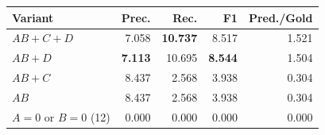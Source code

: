 \begin{center}
\begin{minipage}{\columnwidth}
\label{tab:factorial}
\centering
\small
\setlength{\tabcolsep}{2.2pt}
\begin{tabular}{@{}lrrrr@{}}
\toprule
Variant & Prec. & Rec. & F1 & Pred./Gold \\
\midrule
$AB{+}C{+}D$ & 7.058 & \textbf{10.737} & 8.517 & 1.521 \\
$AB{+}D$ & \textbf{7.113} & 10.695 & \textbf{8.544} & 1.504 \\
$AB{+}C$ & 8.437 & 2.568 & 3.938 & 0.304 \\
$AB$ & 8.437 & 2.568 & 3.938 & 0.304 \\
$A{=}0$ or $B{=}0$ (12) & 0.000 & 0.000 & 0.000 & 0.000 \\
\bottomrule
\end{tabular}
\end{minipage}
\end{center}
